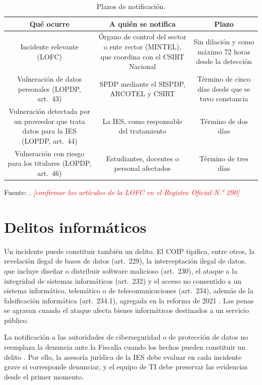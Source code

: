 \documentclass[11pt,a4paper,oneside]{report}
\newcommand{\pendiente}[1]{\textcolor{red}{\textit{[#1]}}}
\begin{document}
\begin{table}[htbp]
  \centering
  \caption{Plazos de notificación.}
  \label{tab:plazos}
  \small
  \begin{tabular}{|C{0.34}|C{0.36}|C{0.30}|}
    \hline
    \textbf{Qué ocurre} & \textbf{A quién se notifica} & \textbf{Plazo} \\
    \hline
    Incidente relevante (LOFC) & Órgano de control del sector o ente rector (MINTEL), que coordina con el CSIRT Nacional & Sin dilación y como máximo 72 horas desde la detección \\
    \hline
    Vulneración de datos personales (LOPDP, art.~43) & SPDP mediante el SISPDP, ARCOTEL y CSIRT & Término de cinco días desde que se tuvo constancia \\
    \hline
    Vulneración detectada por un proveedor que trata datos para la IES (LOPDP, art.~44) & La IES, como responsable del tratamiento & Término de dos días \\
    \hline
    Vulneración con riesgo para los titulares (LOPDP, art.~46) & Estudiantes, docentes o personal afectados & Término de tres días \\
    \hline
  \end{tabular}
  \par\raggedright
  {\footnotesize Fuente: \cite{lofc2026,lopdp2021,spdp2026norma,coa2017}. \pendiente{confirmar los artículos de la LOFC en el Registro Oficial N.° 290}\par}
\end{table}

\section{Delitos informáticos}
\label{sec:delitos}
Un incidente puede constituir también un delito. El COIP tipifica, entre otros, la revelación ilegal de bases de datos (art.~229), la interceptación ilegal de datos, que incluye diseñar o distribuir software malicioso (art.~230), el ataque a la integridad de sistemas informáticos (art.~232) y el acceso no consentido a un sistema informático, telemático o de telecomunicaciones (art.~234), además de la falsificación informática (art.~234.1), agregada en la reforma de 2021 \cite{coip2014}. Las penas se agravan cuando el ataque afecta bienes informáticos destinados a un servicio público.

La notificación a las autoridades de ciberseguridad o de protección de datos no reemplaza la denuncia ante la Fiscalía cuando los hechos pueden constituir un delito \cite{lofc2026}. Por ello, la asesoría jurídica de la IES debe evaluar en cada incidente grave si corresponde denunciar, y el equipo de TI debe preservar las evidencias desde el primer momento.
\end{document}
